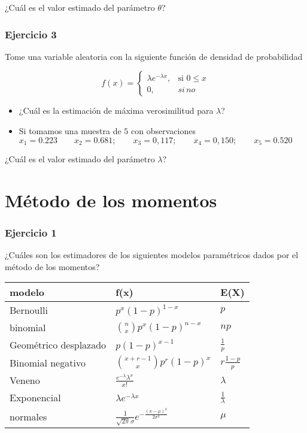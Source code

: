 \documentclass[
]{book}
\begin{document}
¿Cuál es el valor estimado del parámetro \(\theta\)?

\hypertarget{ejercicio-3-4}{%
\subsubsection{Ejercicio 3}\label{ejercicio-3-4}}

Tome una variable aleatoria con la siguiente función de densidad de probabilidad

\[
    f(x)= 
\begin{cases}
    \lambda e^{-\lambda x},& \text{si } 0 \leq x\\
    0,& si \, no 
\end{cases}
\]

\begin{itemize}
\item
  ¿Cuál es la estimación de máxima verosimilitud para \(\lambda\)?
\item
  Si tomamos una muestra de \(5\) con observaciones
  \(x_1 = 0.223 \qquad x_2 = 0.681; \qquad x_3 = 0,117; \qquad x_4 = 0,150; \qquad x_5 = 0.520\)
\end{itemize}

¿Cuál es el valor estimado del parámetro \(\lambda\)?

\hypertarget{muxe9todo-de-los-momentos}{%
\section{Método de los momentos}\label{muxe9todo-de-los-momentos}}

\hypertarget{ejercicio-1-8}{%
\subsubsection{Ejercicio 1}\label{ejercicio-1-8}}

¿Cuáles son los estimadores de los siguientes modelos paramétricos dados por el método de los momentos?

\begin{longtable}[]{@{}lll@{}}
\toprule
modelo & f(x) & E(X) \\
\midrule
\endhead
Bernoulli & \(p^x(1-p)^{1-x}\) & \(p\) \\
binomial & \(\binom n x p^x(1-p)^{n-x}\) & \(np\) \\
Geométrico desplazado & \(p(1-p)^{x-1}\) & \(\frac{1}{p}\) \\
Binomial negativo & \(\binom {x+r-1} x p^r(1-p)^x\) & \(r\frac{1-p}{p}\) \\
Veneno & \(\frac{e^{-\lambda}\lambda^x}{x!}\) & \(\lambda\) \\
Exponencial & \(\lambda e^{-\lambda x}\) & \(\frac{1}{\lambda}\) \\
normales & \(\frac{1}{\sqrt{2\pi}\sigma}e^{-\frac{(x-\mu)^2}{2\sigma^2}}\) & \(\mu\) \\
\bottomrule
\end{longtable}
\end{document}
